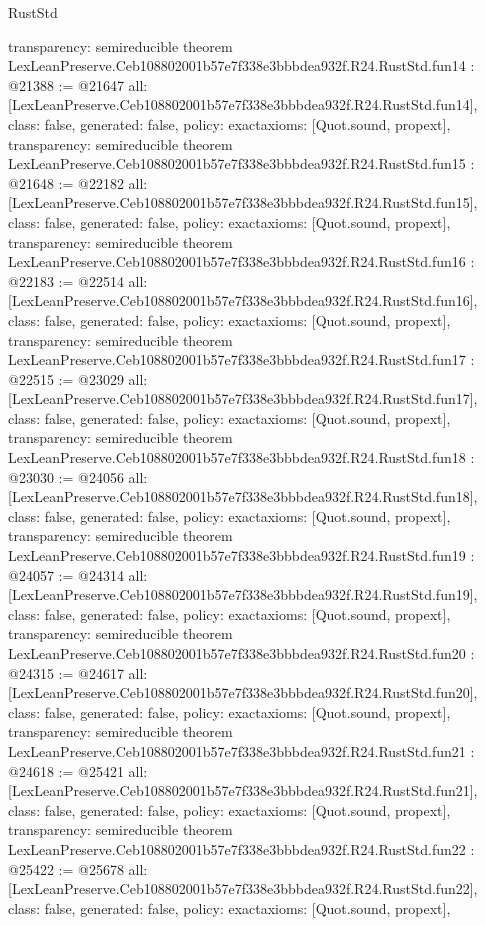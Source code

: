 \begin{lexlean}{RustStd}
\begin{coremodule}
{  transparency: semireducible
}
theorem LexLeanPreserve.Ceb108802001b57e7f338e3bbbdea932f.R24.RustStd.fun14 : @21388 := @21647 {
  all: [LexLeanPreserve.Ceb108802001b57e7f338e3bbbdea932f.R24.RustStd.fun14],
  class: false,
  generated: false,
  policy: exact{axioms: [Quot.sound, propext]},
  transparency: semireducible
}
theorem LexLeanPreserve.Ceb108802001b57e7f338e3bbbdea932f.R24.RustStd.fun15 : @21648 := @22182 {
  all: [LexLeanPreserve.Ceb108802001b57e7f338e3bbbdea932f.R24.RustStd.fun15],
  class: false,
  generated: false,
  policy: exact{axioms: [Quot.sound, propext]},
  transparency: semireducible
}
theorem LexLeanPreserve.Ceb108802001b57e7f338e3bbbdea932f.R24.RustStd.fun16 : @22183 := @22514 {
  all: [LexLeanPreserve.Ceb108802001b57e7f338e3bbbdea932f.R24.RustStd.fun16],
  class: false,
  generated: false,
  policy: exact{axioms: [Quot.sound, propext]},
  transparency: semireducible
}
theorem LexLeanPreserve.Ceb108802001b57e7f338e3bbbdea932f.R24.RustStd.fun17 : @22515 := @23029 {
  all: [LexLeanPreserve.Ceb108802001b57e7f338e3bbbdea932f.R24.RustStd.fun17],
  class: false,
  generated: false,
  policy: exact{axioms: [Quot.sound, propext]},
  transparency: semireducible
}
theorem LexLeanPreserve.Ceb108802001b57e7f338e3bbbdea932f.R24.RustStd.fun18 : @23030 := @24056 {
  all: [LexLeanPreserve.Ceb108802001b57e7f338e3bbbdea932f.R24.RustStd.fun18],
  class: false,
  generated: false,
  policy: exact{axioms: [Quot.sound, propext]},
  transparency: semireducible
}
theorem LexLeanPreserve.Ceb108802001b57e7f338e3bbbdea932f.R24.RustStd.fun19 : @24057 := @24314 {
  all: [LexLeanPreserve.Ceb108802001b57e7f338e3bbbdea932f.R24.RustStd.fun19],
  class: false,
  generated: false,
  policy: exact{axioms: [Quot.sound, propext]},
  transparency: semireducible
}
theorem LexLeanPreserve.Ceb108802001b57e7f338e3bbbdea932f.R24.RustStd.fun20 : @24315 := @24617 {
  all: [LexLeanPreserve.Ceb108802001b57e7f338e3bbbdea932f.R24.RustStd.fun20],
  class: false,
  generated: false,
  policy: exact{axioms: [Quot.sound, propext]},
  transparency: semireducible
}
theorem LexLeanPreserve.Ceb108802001b57e7f338e3bbbdea932f.R24.RustStd.fun21 : @24618 := @25421 {
  all: [LexLeanPreserve.Ceb108802001b57e7f338e3bbbdea932f.R24.RustStd.fun21],
  class: false,
  generated: false,
  policy: exact{axioms: [Quot.sound, propext]},
  transparency: semireducible
}
theorem LexLeanPreserve.Ceb108802001b57e7f338e3bbbdea932f.R24.RustStd.fun22 : @25422 := @25678 {
  all: [LexLeanPreserve.Ceb108802001b57e7f338e3bbbdea932f.R24.RustStd.fun22],
  class: false,
  generated: false,
  policy: exact{axioms: [Quot.sound, propext]},
}
\end{coremodule}
\end{lexlean}
